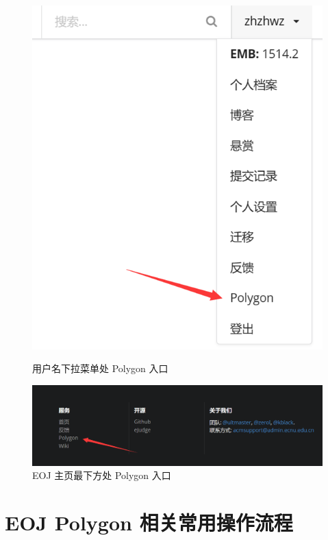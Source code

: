 \documentclass[oneside]{book}
\begin{document}
\begin{figure}[htbp]
  \centering
  \begin{minipage}{0.28\textwidth}
    \centering
    \includegraphics[width=\textwidth]{res/polygon_entry_user.png}
    \caption{用户名下拉菜单处 Polygon 入口}
    \label{fig:polygon_entry_user}
  \end{minipage}
  \begin{minipage}{0.7\textwidth}
    \centering
    \includegraphics[width=\textwidth]{res/polygon_entry_main_page.png}
    \caption{EOJ 主页最下方处 Polygon 入口}
    \label{fig:polygon_entry_main_page}
  \end{minipage}
\end{figure}

\section{EOJ Polygon 相关常用操作流程}
\end{document}
